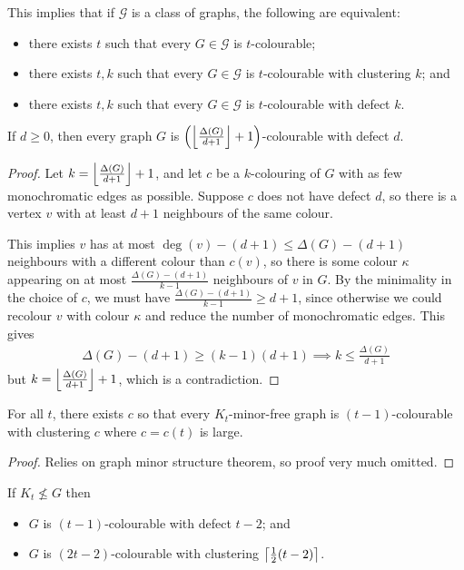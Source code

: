 \documentclass[main.tex]{subfiles}
\begin{document}
This implies that if $\mathcal G$ is a class of graphs, the following are equivalent:
\begin{itemize}
  \item there exists $t$ such that every $G\in\mathcal G$ is $t$-colourable;
  \item there exists $t,k$ such that every $G\in\mathcal G$ is $t$-colourable
    with clustering $k$; and
  \item there exists $t,k$ such that every $G\in\mathcal G$ is $t$-colourable
    with defect $k$.
\end{itemize}
\begin{theorem}
  If $d\geq 0$, then every graph $G$ is
  $\left(\left\lfloor \frac{\Delta(G)}{d+1} \right\rfloor+1\right)$-colourable with defect $d$.
\end{theorem}
\begin{proof}
  Let $k = \left\lfloor \frac{\Delta(G)}{d+1} \right\rfloor+1$, and let $c$ be a $k$-colouring of
  $G$ with as few monochromatic edges as possible.
  Suppose $c$ does not have defect $d$, so there is a vertex $v$ with at least
  $d+1$ neighbours of the same colour.

  This implies $v$ has at most $\deg(v) - (d+1)\leq\Delta(G) - (d+1)$ neighbours
  with a different colour than $c(v)$, so there is some colour $\kappa$
  appearing on at most $\frac{\Delta(G) - (d+1)}{k-1}$ neighbours of $v$ in $G$.
  By the minimality in the choice of $c$, we must have
  $\frac{\Delta(G)-(d+1)}{k-1}\geq d+1$, since otherwise we could recolour $v$
  with colour $\kappa$ and reduce the number of monochromatic edges.
  This gives
  \begin{align*}
    \Delta(G) - (d+1)\geq(k-1)(d+1)\implies k\leq\frac{\Delta(G)}{d+1}
  \end{align*}
  but $k = \left\lfloor \frac{\Delta(G)}{d+1} \right\rfloor+1$, which is a contradiction.
\end{proof}
\begin{theorem}
  For all $t$, there exists $c$ so that every $K_t$-minor-free graph is
  $(t-1)$-colourable with clustering $c$ where $c = c(t)$ is large.
\end{theorem}
\begin{proof}
  Relies on graph minor structure theorem, so proof very much omitted.
\end{proof}
\begin{theorem}
  If $K_t\not\leq G$ then
  \begin{itemize}
    \item $G$ is $(t-1)$-colourable with defect $t-2$; and
    \item $G$ is $(2t-2)$-colourable with clustering $\left\lceil \frac{1}{2}(t-2) \right\rceil$.
  \end{itemize}
\end{theorem}
\end{document}
